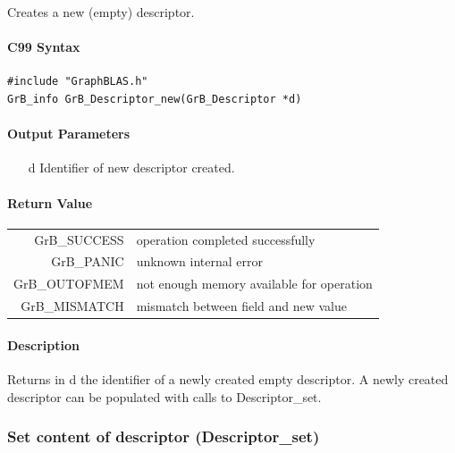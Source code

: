 \documentclass[11pt]{extarticle}
\begin{document}
Creates a new (empty) descriptor.

\paragraph{C99 Syntax}

\begin{verbatim}
#include "GraphBLAS.h"
GrB_info GrB_Descriptor_new(GrB_Descriptor *d)
\end{verbatim}

\paragraph{Output Parameters}

\begin{itemize}
	\item[{\sf d}] Identifier of new descriptor created.
\end{itemize}

\paragraph{Return Value}

\begin{tabular}{rl} 
{\sf GrB\_SUCCESS} 	& operation completed successfully \\
{\sf GrB\_PANIC}	& unknown internal error \\
{\sf GrB\_OUTOFMEM}	& not enough memory available for operation \\
{\sf GrB\_MISMATCH}	& mismatch between field and new value
\end{tabular}

\paragraph{Description}

Returns in {\sf d} the identifier of a newly created empty descriptor.
A newly created descriptor can be populated with calls to {\sf
Descriptor\_set}.

\subsubsection{Set content of descriptor ({\sf Descriptor\_set})}

\end{document}
